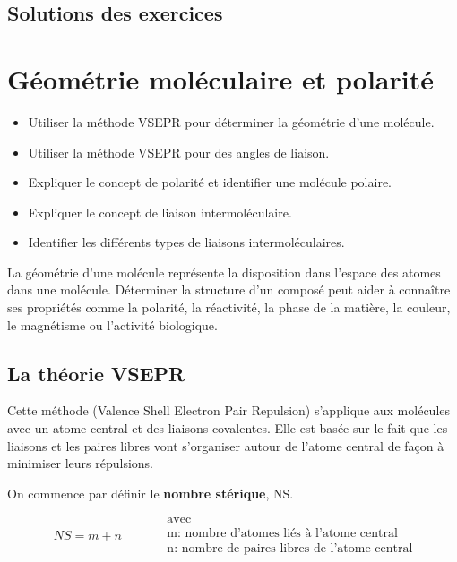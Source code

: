 \documentclass[
  11pt,
  a4paper,
  openany]{book}
\providecommand{\tightlist}{%
  \setlength{\itemsep}{0pt}\setlength{\parskip}{0pt}}
\begin{document}
\section{Solutions des exercices} \shipoutAnswer

\hypertarget{guxe9omuxe9trie-moluxe9culaire-et-polarituxe9}{%
\chapter{Géométrie moléculaire et polarité}\label{guxe9omuxe9trie-moluxe9culaire-et-polarituxe9}}

\begin{objectives}

\begin{itemize}
\tightlist
\item
  Utiliser la méthode VSEPR pour déterminer la géométrie d'une molécule.
\item
  Utiliser la méthode VSEPR pour des angles de liaison.
\item
  Expliquer le concept de polarité et identifier une molécule polaire.
\item
  Expliquer le concept de liaison intermoléculaire.
\item
  Identifier les différents types de liaisons intermoléculaires.
\end{itemize}

\end{objectives}

La géométrie d'une molécule représente la disposition dans l'espace des atomes dans une molécule. Déterminer la structure d'un composé peut aider à connaître ses propriétés comme la polarité, la réactivité, la phase de la matière, la couleur, le magnétisme ou l'activité biologique.

\hypertarget{la-thuxe9orie-vsepr}{%
\section{La théorie VSEPR}\label{la-thuxe9orie-vsepr}}

Cette méthode (Valence Shell Electron Pair Repulsion) s'applique aux molécules avec un atome central et des liaisons covalentes. Elle est basée sur le fait que les liaisons et les paires libres vont s'organiser autour de l'atome central de façon à minimiser leurs répulsions.

On commence par définir le \textbf{nombre stérique}, NS.

\[ \begin{split}
    NS = m + n
  \end{split}
  \qquad
  \begin{split}
    &\text{avec} \\
    &\text{m: nombre d'atomes liés à l'atome central} \\
    &\text{n: nombre de paires libres de l'atome central}
  \end{split} \]
\end{document}
